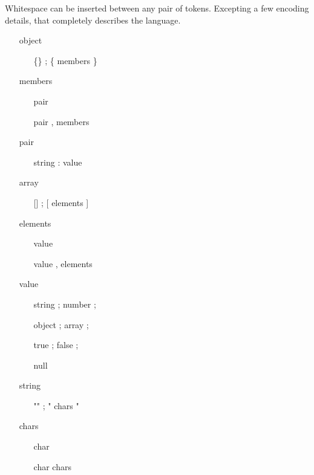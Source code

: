 \documentclass[11pt,twoside,a4paper]{article}
\begin{document}
\begin{minipage}[h]{0.70\textwidth}
	Whitespace can be inserted between any pair of tokens. Excepting a few encoding details, that completely describes the language.~\\

\end{minipage} \hfill \begin{minipage}[h]{0.30\textwidth}
	\footnotesize
	\begin{itemize}
		\item[] object
		\begin{itemize}
			\item[] \{\} ; \{ members \}
		\end{itemize} 
		\item[] members
		\begin{itemize}
			\item[] pair
			\item[] pair , members
		\end{itemize}
		\item[] pair
		\begin{itemize}
			\item[] string : value
		\end{itemize}
		\item[] array
		\begin{itemize}
			\item[] [] ; [ elements ]
		\end{itemize}
		\item[] elements
		\begin{itemize}
			\item[] value
			\item[] value , elements
		\end{itemize}
		\item[] value
		\begin{itemize}
			\item[] string ; number ; 
			\item[] object ; array ;
			\item[] true ; false ;
			\item[] null
		\end{itemize}
		\item[] string
		\begin{itemize}
			\item[] "" ; " chars "
		\end{itemize}
		\item[] chars
		\begin{itemize}
			\item[] char
			\item[] char chars

\end{itemize}
\end{itemize}
\end{minipage}
\end{document}
